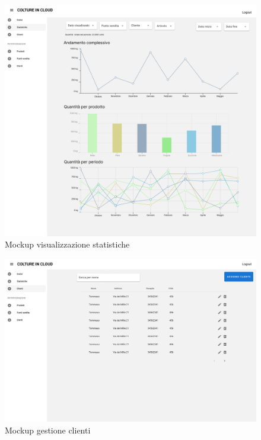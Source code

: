\documentclass[italian]{report}
\begin{document}
\begin{figure}[htp]
    \centering
    \includegraphics[width=\textwidth]{assets/mockup_stats.jpg}
    \caption{Mockup visualizzazione statistiche}
    \label{fig:analytics}
\end{figure}
\begin{figure}[htp]
    \centering
    \includegraphics[width=\textwidth]{assets/mockup_customers.jpg}
    \caption{Mockup gestione clienti}
    \label{fig:getClients}
\end{figure}
\end{document}
